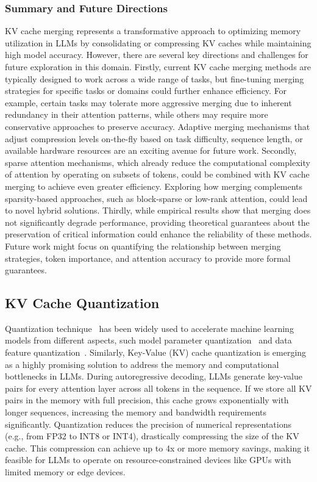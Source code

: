 \subsubsection{Summary and Future Directions}
KV cache merging represents a transformative approach to optimizing memory utilization in LLMs by consolidating or compressing KV caches while maintaining high model accuracy.
However, there are several key directions and challenges for future exploration in this domain.
Firstly,
current KV cache merging methods are typically designed to work across a wide range of tasks, but fine-tuning merging strategies for specific tasks or domains could further enhance efficiency. For example, certain tasks may tolerate more aggressive merging due to inherent redundancy in their attention patterns, while others may require more conservative approaches to preserve accuracy. Adaptive merging mechanisms that adjust compression levels on-the-fly based on task difficulty, sequence length, or available hardware resources are an exciting avenue for future work.
Secondly,
sparse attention mechanisms, which already reduce the computational complexity of attention by operating on subsets of tokens, could be combined with KV cache merging to achieve even greater efficiency. Exploring how merging complements sparsity-based approaches, such as block-sparse or low-rank attention, could lead to novel hybrid solutions.
Thirdly,
while empirical results show that merging does not significantly degrade performance, providing theoretical guarantees about the preservation of critical information could enhance the reliability of these methods. Future work might focus on quantifying the relationship between merging strategies, token importance, and attention accuracy to provide more formal guarantees.






\subsection{KV Cache Quantization}\label{ssec:kv_quant}
Quantization technique~\cite{lin2016fixed, wu2020integer, kwasniewska2019deep, zhou2018adaptive,jiang2018linear} has been widely used to accelerate machine learning models from different aspects, such model parameter quantization~\cite{frantar2022gptq, dettmers2024qlora, bondarenko2023quantizable,cheng2017quantized} and data feature quantization~\cite{zhou2023dataset,jegou2010product}.
Similarly,
Key-Value (KV) cache quantization is emerging as a highly promising solution to address the memory and computational bottlenecks in LLMs. 
During autoregressive decoding, LLMs generate key-value pairs for every attention layer across all tokens in the sequence. 
If we store all KV pairs in the memory with full precision,
this cache grows exponentially with longer sequences, increasing the memory and bandwidth requirements significantly. 
Quantization reduces the precision of numerical representations (e.g., from FP32 to INT8 or INT4), drastically compressing the size of the KV cache. 
This compression can achieve up to 4x or more memory savings, making it feasible for LLMs to operate on resource-constrained devices like GPUs with limited memory or edge devices.

